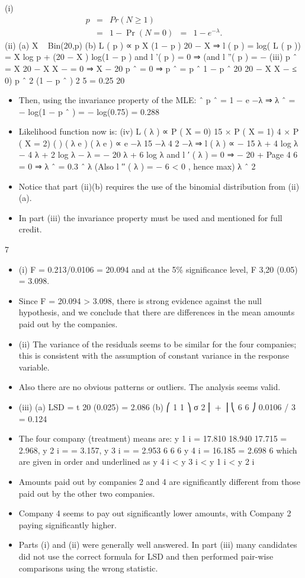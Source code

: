 \documentclass[a4paper,12pt]{article}
\begin{document}
(i) \begin{eqnarray*}p &=& Pr( N \geq 1) \\ &=& 1 − \Pr( N = 0) &=& 1 − e^{−\lambda} .\end{eqnarray*}
(ii) (a)
X ~ Bin(20,p)
(b)
L ( p ) ∝ p X (1 − p ) 20 − X
⇒ l ( p ) = log( L ( p )) = X log p + (20 − X ) log(1 − p )
and l '( p ) = 0 ⇒
(and l ''( p ) = −
(iii)
p ˆ =
X 20 − X
X
−
= 0 ⇒ X − 20 p ˆ = 0 ⇒ p ˆ =
p ˆ
1 − p ˆ
20
20 − X
X
−
≤ 0)
p ˆ 2 (1 − p ˆ ) 2
5
= 0.25
20
\begin{itemize}
\item Then, using the invariance property of the MLE:
ˆ
p ˆ = 1 − e −λ ⇒ λ ˆ = − log(1 − p ˆ ) = − log(0.75) = 0.288
\item Likelihood function now is:
(iv)
L ( λ ) ∝ P ( X = 0) 15 × P ( X = 1) 4 × P ( X = 2)
( ) ( λ e ) ( λ e )
∝ e −λ
15
−λ
4
2 −λ
⇒ l ( λ ) ∝ − 15 λ + 4 log λ − 4 λ + 2 log λ − λ = − 20 λ + 6 log λ
and l ′ ( λ ) = 0 ⇒ − 20 +
Page 4
6
= 0 ⇒ λ ˆ = 0.3
ˆ λ
(Also l ′′ ( λ ) = −
6
< 0 , hence max)
λ ˆ 2
\item Notice that part (ii)(b) requires the use of the binomial distribution from (ii)(a).
\item In part (iii)
the invariance property must be used and mentioned for full credit.
\end{itemize}
7
\begin{itemize}
\item (i) F = 0.213/0.0106 = 20.094 and at the 5\% significance level,
F 3,20 (0.05) = 3.098.
\item Since F = 20.094 > 3.098, there is strong evidence against the null hypothesis, and we conclude that there are differences in the mean amounts paid out by the companies.
\item (ii) The variance of the residuals seems to be similar for the four companies; this is consistent with the assumption of constant variance in the response variable.
\item Also there are no obvious patterns or outliers. The analysis seems valid.
\item (iii) (a)
LSD = t 20 (0.025)
= 2.086
(b)
⎛ 1 1 ⎞
σ 2 ⎜ + ⎟
⎝ 6 6 ⎠
0.0106 / 3 = 0.124
\item The four company (treatment) means are:
y 1 i = 17.810
18.940
17.715
= 2.968, y 2 i =
= 3.157, y 3 i =
= 2.953
6
6
6
y 4 i = 16.185
= 2.698
6
which are given in order and underlined as
y 4 i < y 3 i < y 1 i < y 2 i
\item Amounts paid out by companies 2 and 4 are significantly different from those paid out by the other two companies. 
\item Company 4 seems to pay out significantly lower amounts, with Company 2 paying
significantly higher.
\item Parts (i) and (ii) were generally well answered. In part (iii) many candidates did not use the
correct formula for LSD and then performed pair-wise comparisons using the wrong statistic.
\end{itemize}
\end{document}
